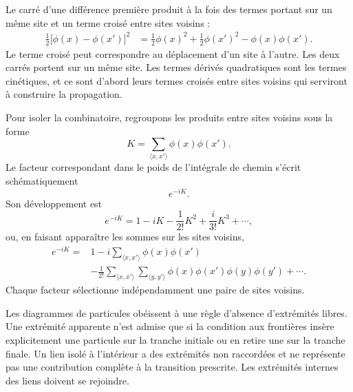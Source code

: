 \begin{classroomqa}
\end{classroomqa}

Le carré d’une différence première produit à la fois des termes portant sur un même site et un terme croisé entre sites voisins :
\begin{align}
\frac{1}{2}\bigl[\phi(x)-\phi(x')\bigr]^2
&=
\frac{1}{2}\phi(x)^2
+\frac{1}{2}\phi(x')^2
-\phi(x)\phi(x').
\end{align}
Le terme croisé peut correspondre au déplacement d’un site à l’autre. Les deux carrés portent sur un même site. Les termes dérivés quadratiques sont les termes cinétiques, et ce sont d’abord leurs termes croisés entre sites voisins qui serviront à construire la propagation.

Pour isoler la combinatoire, regroupons les produits entre sites voisins sous la forme
\begin{equation}
K=\sum_{\langle x,x'\rangle}\phi(x)\phi(x').
\end{equation}
Le facteur correspondant dans le poids de l’intégrale de chemin s’écrit schématiquement
\begin{equation}
e^{-iK}.
\end{equation}
Son développement est
\begin{equation}
e^{-iK}
=1-iK-\frac{1}{2!}K^2+\frac{i}{3!}K^3+\cdots,
\end{equation}
ou, en faisant apparaître les sommes sur les sites voisins,
\begin{align}
e^{-iK}
={}&1
-i\sum_{\langle x,x'\rangle}\phi(x)\phi(x')
\nonumber\\
&-\frac{1}{2!}
\sum_{\langle x,x'\rangle}
\sum_{\langle y,y'\rangle}
\phi(x)\phi(x')\phi(y)\phi(y')
+\cdots .
\end{align}
Chaque facteur sélectionne indépendamment une paire de sites voisins.

Les diagrammes de particules obéissent à une règle d’absence d’extrémités libres. Une extrémité apparente n’est admise que si la condition aux frontières insère explicitement une particule sur la tranche initiale ou en retire une sur la tranche finale. Un lien isolé à l’intérieur a des extrémités non raccordées et ne représente pas une contribution complète à la transition prescrite. Les extrémités internes des liens doivent se rejoindre.

